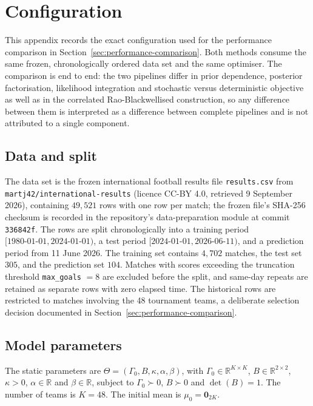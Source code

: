 \chapter{Configuration}
\label{app:config}

This appendix records the exact configuration used for the performance comparison in Section~\ref{sec:performance-comparison}. Both methods consume the same frozen, chronologically ordered data set and the same optimiser. The comparison is end to end: the two pipelines differ in prior dependence, posterior factorisation, likelihood integration and stochastic versus deterministic objective as well as in the correlated Rao-Blackwellised construction, so any difference between them is interpreted as a difference between complete pipelines and is not attributed to a single component.

\section{Data and split}

The data set is the frozen international football results file \texttt{results.csv} from \texttt{martj42/international-results} (licence CC-BY 4.0, retrieved 9 September 2026), containing $49{,}521$ rows with one row per match; the frozen file's SHA-256 checksum is recorded in the repository's data-preparation module at commit \texttt{336842f}. The rows are split chronologically into a training period $[1980\text{-}01\text{-}01, 2024\text{-}01\text{-}01)$, a test period $[2024\text{-}01\text{-}01, 2026\text{-}06\text{-}11)$, and a prediction period from 11 June 2026. The training set contains $4{,}702$ matches, the test set $305$, and the prediction set $104$. Matches with scores exceeding the truncation threshold \texttt{max\_goals} $= 8$ are excluded before the split, and same-day repeats are retained as separate rows with zero elapsed time. The historical rows are restricted to matches involving the 48 tournament teams, a deliberate selection decision documented in Section~\ref{sec:performance-comparison}.

\section{Model parameters}

The static parameters are $\Theta = (\Gamma_0, B, \kappa, \alpha, \beta)$, with $\Gamma_0 \in \mathbb{R}^{K \times K}$, $B \in \mathbb{R}^{2 \times 2}$, $\kappa > 0$, $\alpha \in \mathbb{R}$ and $\beta \in \mathbb{R}$, subject to $\Gamma_0 \succ 0$, $B \succ 0$ and $\det(B) = 1$. The number of teams is $K = 48$. The initial mean is $\mu_0 = \mathbf{0}_{2K}$.

